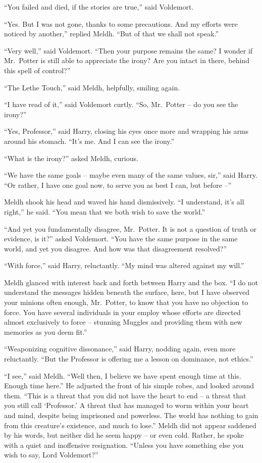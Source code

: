 ``You failed and died, if the stories are true,'' said Voldemort.

``Yes. But I was not gone, thanks to some precautions. And my efforts
were noticed by another,'' replied Meldh. ``But of that we shall not
speak.''

``Very well,'' said Voldemort. ``Then your purpose remains the same? I
wonder if Mr.~Potter is still able to appreciate the irony? Are you
intact in there, behind this spell of control?''

``The Lethe Touch,'' said Meldh, helpfully, smiling again.

``I have read of it,'' said Voldemort curtly. ``So, Mr.~Potter -- do you
see the irony?''

``Yes, Professor,'' said Harry, closing his eyes once more and wrapping
his arms around his stomach. ``It's me. And I can see the irony.''

``What is the irony?'' asked Meldh, curious.

``We have the same goals -- maybe even many of the same values, sir,''
said Harry. ``Or rather, I have one goal now, to serve you as best I
can, but before --''

Meldh shook his head and waved his hand dismissively. ``I understand,
it's all right,'' he said. ``You mean that we both wish to save the
world.''

``And yet you fundamentally disagree, Mr.~Potter. It is not a question
of truth or evidence, is it?'' asked Voldemort. ``You have the same
purpose in the same world, and yet you disagree. And how was that
disagreement resolved?''

``With force,'' said Harry, reluctantly. ``My mind was altered against
my will.''

Meldh glanced with interest back and forth between Harry and the box.
``I do not understand the messages hidden beneath the surface, here, but
I have observed your minions often enough, Mr.~Potter, to know that you
have no objection to force. You have several individuals in your employ
whose efforts are directed almost exclusively to force -- stunning
Muggles and providing them with new memories as you deem fit.''

``Weaponizing cognitive dissonance,'' said Harry, nodding again, even
more reluctantly. ``But the Professor is offering me a lesson on
dominance, not ethics.''

``I see,'' said Meldh. ``Well then, I believe we have spent enough time
at this. Enough time here.'' He adjusted the front of his simple robes,
and looked around them. ``This is a threat that you did not have the
heart to end -- a threat that you still call `Professor.' A threat that
has managed to worm within your heart and mind, despite being imprisoned
and powerless. The world has nothing to gain from this creature's
existence, and much to lose.'' Meldh did not appear saddened by his
words, but neither did he seem happy -- or even cold. Rather, he spoke
with a quiet and inoffensive resignation. ``Unless you have something
else you wish to say, Lord Voldemort?''

